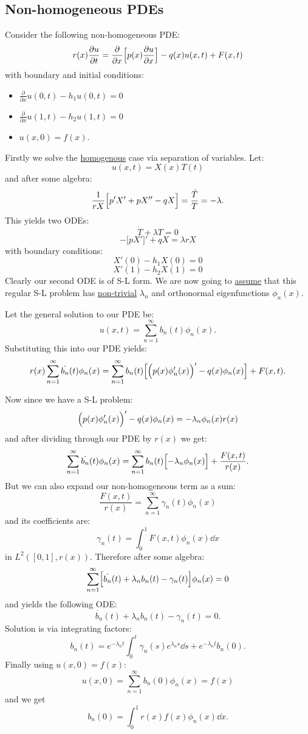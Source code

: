 \documentclass{article}
\begin{document}
\subsection{Non-homogeneous PDEs}
Consider the following non-homogeneous PDE:
$$r(x)\frac{\partial u}{\partial t}
=\frac{\partial}{\partial x}\Bigl[
p(x)\frac{\partial u}{\partial x}
\Bigr]-q(x)u(x,t)+F(x,t)$$
with boundary and initial conditions:
\begin{itemize}
    \item $\displaystyle\frac{\partial}{\partial x}
    u(0,t)-h_1 u(0,t)=0$
    \item $\displaystyle\frac{\partial}{\partial x}
    u(1,t)-h_2 u(1,t)=0$
    \item $u(x,0)=f(x)$.
\end{itemize}
Firstly we solve the \underline{homogenous} 
case via separation of variables. Let:
$$u(x,t)=X(x)T(t)$$
and after some algebra:
$$\frac{1}{rX}\Bigl[p'X'+pX''
-qX\Bigr]=\frac{\dot{T}}{T}=-\lambda.$$
This yields two ODEs:
$$\dot{T}+\lambda T=0$$
$$-\bigl[pX'\bigr]'+qX=\lambda rX$$
with boundary conditions:
$$X'(0)-h_1 X(0)=0$$
$$X'(1)-h_2 X(1)=0$$
Clearly our second ODE is of S-L form.
We are now going to \underline{assume} that this
regular S-L problem has \underline{non-trivial} $\lambda_n$
and orthonormal eigenfunctions $\phi_n(x)$.

Let the general solution to our PDE be:
$$u(x,t)=\sum_{n=1}^{\infty}b_n(t)\phi_n(x).$$
Substituting this into our PDE yields:
$$r(x)\sum_{n=1}^{\infty}\dot{b_n}(t)\phi_n(x)
=\sum_{n=1}^{\infty}b_n(t)\Bigl[\Bigl(p(x)
\phi'_n(x)\Bigr)'-q(x)\phi_n(x)\Bigr]+F(x,t).$$

\newpage

Now since we have a S-L problem:
$$\Bigl(p(x)\phi'_n(x)\Bigr)'-q(x)\phi_n(x)
=-\lambda_n\phi_n(x)r(x)$$
and after dividing through our PDE by $r(x)$ we get:
$$\sum_{n=1}^{\infty}\dot{b_n}(t)\phi_n(x)
=\sum_{n=1}^{\infty}b_n(t)\Bigl[-\lambda_n\phi_n(x)\Bigr]
+\frac{F(x,t)}{r(x)}.$$
But we can also expand our non-homogeneous term as a sum:
$$\frac{F(x,t)}{r(x)}=\sum_{n=1}^{\infty}\gamma_n(t)\phi_n(x)$$
and its coefficients are:
$$\gamma_n(t)=\int_{0}^{1}F(x,t)\phi_n(x)\dd x$$
in $L^2([0,1],r(x))$. Therefore after some algebra:
$$\sum_{n=1}^{\infty}\Bigl[\dot{b_n}(t)
+\lambda_n b_n(t)-\gamma_n(t)\Bigr]\phi_n(x)=0$$
and yields the following ODE:
$$\dot{b_n}(t)
+\lambda_n b_n(t)-\gamma_n(t)=0.$$
Solution is via integrating factors:
$$b_n(t)=e^{-\lambda_n t}
\int_{0}^{t}\gamma_n(s)e^{\lambda_n s}\dd s
+e^{-\lambda_n t}b_n(0).$$
Finally using $u(x,0)=f(x)$:
$$u(x,0)=\sum_{n=1}^{\infty}b_n(0)\phi_n(x)
=f(x)$$
and we get
$$b_n(0)=\int_{0}^{1}r(x)f(x)\phi_n(x)\dd x.$$
\newpage
\end{document}
